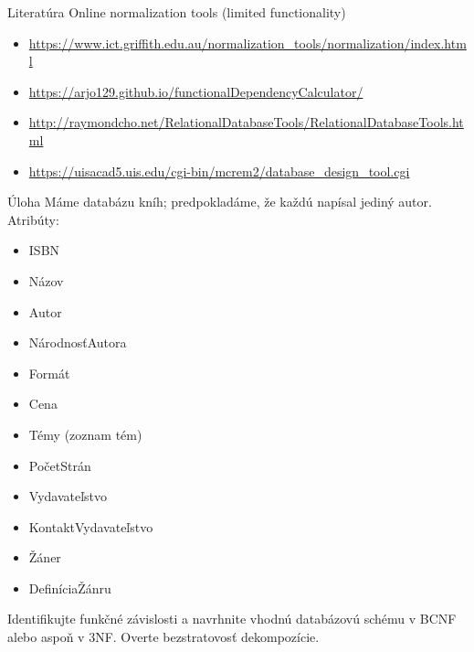 \documentclass[12pt]{beamer}
\begin{document}
\begin{frame}{Literatúra}
Online normalization tools (limited functionality)
\begin{itemize}
\item {\scriptsize\url{https://www.ict.griffith.edu.au/normalization_tools/normalization/index.html}}
\item {\scriptsize\url{https://arjo129.github.io/functionalDependencyCalculator/}}
\item {\scriptsize\url{http://raymondcho.net/RelationalDatabaseTools/RelationalDatabaseTools.html}}
\item {\scriptsize\url{https://uisacad5.uis.edu/cgi-bin/mcrem2/database_design_tool.cgi}}
\end{itemize}
\end{frame}

\begin{frame}[fragile]{Úloha}
Máme databázu kníh; predpokladáme, že každú napísal jediný autor. Atribúty:\\[3mm]
\begin{minipage}{.4\pdfpagewidth}
\begin{itemize}
\item ISBN
\item Názov
\item Autor
\item NárodnosťAutora
\item Formát
\item Cena
\end{itemize}
\end{minipage}
\begin{minipage}{.4\pdfpagewidth}
\begin{itemize}
\item Témy (zoznam tém)
\item PočetStrán
\item Vydavateľstvo
\item KontaktVydavateľstvo
\item Žáner
\item DefiníciaŽánru
\end{itemize}
\end{minipage}

\bigskip
Identifikujte funkčné závislosti a navrhnite vhodnú databázovú schému v BCNF alebo aspoň v 3NF.
Overte bezstratovosť dekompozície.
\end{frame}
\end{document}
